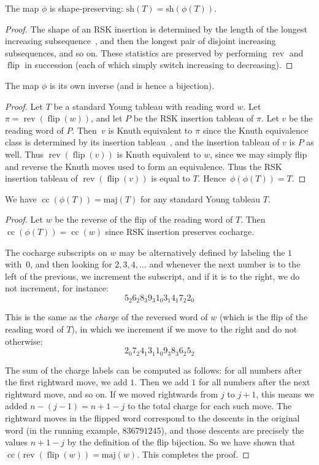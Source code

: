 \documentclass[ALCO,Unicode]{cedram}
\DeclareMathOperator{\cc}{cc}
\DeclareMathOperator{\flip}{flip}
\DeclareMathOperator{\rev}{rev}
\newcommand{\sh}{\mathrm{sh}}
\newcommand{\maj}{\mathrm{maj}}
\begin{document}
\begin{lemma}
	The map $\phi$ is shape-preserving: $\sh(T)=\sh(\phi(T))$.
\end{lemma}
\begin{proof}
	The shape of an RSK insertion is determined by the length of the longest increasing subsequence~\cite{Fulton}, and then the longest pair of disjoint increasing subsequences, and so on.  These statistics are preserved by performing $\rev$ and $\flip$ in succession (each of which simply switch increasing to decreasing).      
\end{proof}

\begin{lemma}
	The map $\phi$ is its own inverse (and is hence a bijection).
\end{lemma}

\begin{proof}
	Let $T$ be a standard Young tableau with reading word $w$.  Let $\pi=\rev(\flip(w))$, and let $P$ be the RSK insertion tableau of $\pi$.  Let $v$ be the reading word of $P$.  Then~$v$ is Knuth equivalent to $\pi$ since the Knuth equivalence class is determined by its insertion tableau~\cite{Fulton}, and the insertion tableau of $v$ is $P$ as well.  Thus $\rev(\flip(v))$ is Knuth equivalent to $w$, since we may simply flip and reverse the Knuth moves used to form an equivalence. 
	Thus the RSK insertion tableau of $\rev(\flip(v))$ is equal to $T$.  Hence~$\phi(\phi(T))=T$.
\end{proof}

\begin{prop}
	We have $\cc(\phi(T))=\maj(T)$ for any standard Young tableau $T$.    
\end{prop}

\begin{proof}
	Let $w$ be the reverse of the flip of the reading word of $T$. Then $\cc(\phi(T))=\cc(w)$ since RSK insertion preserves cocharge.  
	
	The cocharge subscripts on $w$ may be alternatively defined by labeling the $1$ with~$0$, and then looking for $2,3,4,\ldots$ and whenever the next number is to the left of the previous, we increment the subscript, and if it is to the right, we do not increment, for instance:
	$$5_2 6_2 8_3 9_3 1_0 3_1 4_1 7_2 2_0$$
	
	This is the same as the \textit{charge} of the reversed word of $w$ (which is the flip of the reading word of $T$), in which we increment if we move to the right and do not otherwise:
	$$2_0 7_2 4_1 3_1 1_0 9_3 8_3 6_2 5_2$$
	
	The sum of the charge labels can be computed as follows: for all numbers after the first rightward move, we add $1$.  Then we add $1$ for all numbers after the next rightward move, and so on.  If we moved rightwards from $j$ to $j+1$, this means we added $n-(j-1)=n+1-j$ to the total charge for each such move.  The rightward moves in the flipped word correspond to the descents in the original word (in the running example, $836791245$), and those descents are precisely the values $n+1-j$ by the definition of the flip bijection.  So we have shown that $\cc(\rev(\flip(w))=\maj(w)$.  This completes the proof. 
\end{proof}
\end{document}
